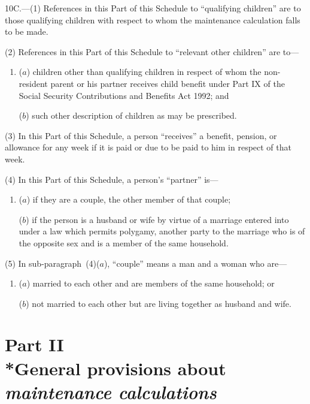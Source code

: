 \documentclass[12pt,a4paper]{article}
\begin{document}
10C.---(1) References in this Part of this Schedule to “qualifying children” are to those qualifying children with respect to whom the maintenance calculation falls to be made.

(2) References in this Part of this Schedule to “relevant other children” are to—
\begin{enumerate}\item[]
($a$) children other than qualifying children in respect of whom the non-resident parent or his partner receives child benefit under Part IX of the Social Security Contributions and Benefits Act 1992; and

($b$) such other description of children as may be prescribed.
\end{enumerate}

(3) In this Part of this Schedule, a person “receives” a benefit, pension, or allowance for any week if it is paid or due to be paid to him in respect of that week.

(4) In this Part of this Schedule, a person’s “partner” is—
\begin{enumerate}\item[]
($a$) if they are a couple, the other member of that couple;

($b$) if the person is a husband or wife by virtue of a marriage entered into under a law which permits polygamy, another party to the marriage who is of the opposite sex and is a member of the same household.
\end{enumerate}

(5) In sub-paragraph~(4)($a$), “couple” means a man and a woman who are—
\begin{enumerate}\item[]
($a$) married to each other and are members of the same household; or

($b$) not married to each other but are living together as husband and wife.
\end{enumerate}

\section[Part II --- General provisions about 
\emph{maintenance calculations}  %
]{Part II\\*General provisions about 
\emph{maintenance calculations}  %
}

\renewcommand\parthead{--- Schedule 1 Part II}
\end{document}
